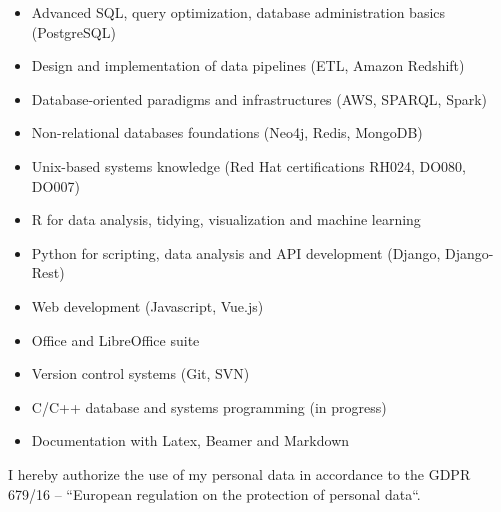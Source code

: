 \documentclass[10pt, a4paper, roman]{moderncv}        %
\begin{document}
	\begin{itemize}
		
		\item Advanced SQL, query optimization, database administration basics (PostgreSQL)
		
		\vspace{1pt}
		
		\item Design and implementation of data pipelines (ETL, Amazon Redshift)
		
		\vspace{1pt}
		
		\item Database-oriented paradigms and infrastructures (AWS, SPARQL, Spark)
		
		\vspace{1pt}
		
		\item Non-relational databases foundations (Neo4j, Redis, MongoDB)
		
		\vspace{1pt}
		
		\item Unix-based systems knowledge (Red Hat certifications RH024, DO080, DO007)
		
		\vspace{1pt}
		
		\item R for data analysis, tidying, visualization and machine learning
		
		\vspace{1pt}
		
		\item Python for scripting, data analysis and API development (Django, Django-Rest)
		
		\vspace{1pt}
		
		\item Web development (Javascript, Vue.js)
		
		\vspace{1pt}
		
		\item Office and LibreOffice suite
		
		\vspace{1pt}
		
		\item Version control systems (Git, SVN)
		
		\vspace{1pt}
		
		\item C/C++ database and systems programming (in progress)
		
		\vspace{1pt}
		
		\item Documentation with Latex, Beamer and Markdown
		
	\end{itemize}
	
	\vspace{170pt}
	I hereby authorize the use of my personal data in accordance to the GDPR 679/16 – “European regulation on the protection of personal data``.
	
\end{document}
